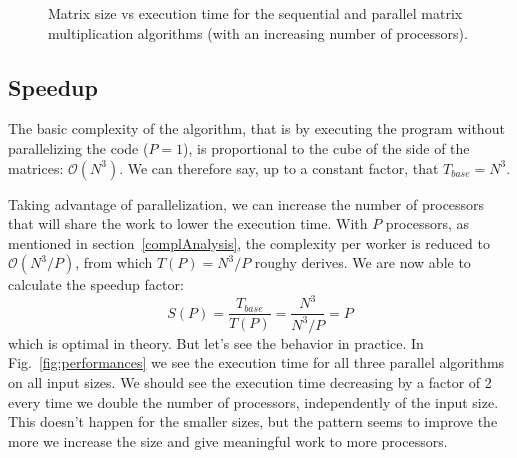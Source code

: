 \documentclass[11pt]{article}
\begin{document}
\begin{figure}[ht]
     \centering
    
    \caption{Matrix size vs execution time for the sequential and parallel matrix multiplication algorithms (with an increasing number of processors).}
    \label{fig:times}
\end{figure}

\subsection{Speedup}
The basic complexity of the algorithm, that is by executing the program without parallelizing the code ($P = 1$), is proportional to the cube of the side of the matrices: $\mathcal{O}(N^3)$. We can therefore say, up to a constant factor, that $T_{base} = N^3$.

Taking advantage of parallelization, we can increase the number of processors that will share the work to lower the execution time. With $P$ processors, as mentioned in section~\ref{complAnalysis}, the complexity per worker is reduced to $\mathcal{O}(N^3/P)$, from which $T(P) = N^3 / P$ roughy derives. We are now able to calculate the speedup factor: \begin{equation*}
    S(P) = \frac{T_{base}}{T(P)} = \frac{N^3}{N^3 / P} = P
\end{equation*}
which is optimal in theory. But let's see the behavior in practice. In Fig.~\ref{fig:performances} we see the execution time for all three parallel algorithms on all input sizes. We should see the execution time decreasing by a factor of 2 every time we double the number of processors, independently of the input size. This doesn't happen for the smaller sizes, but the pattern seems to improve the more we increase the size and give meaningful work to more processors.
\end{document}
